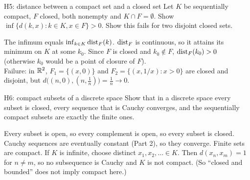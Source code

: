 \begin{exam}{H5: distance between a compact set and a closed set}
Let $K$ be sequentially compact, $F$ closed, both nonempty and $K\cap F=\emptyset$. Show
$\inf\{d(k,x):k\in K,x\in F\}>0$. Show this fails for two disjoint closed sets.
\end{exam}
\begin{answer}
The infimum equals $\inf_{k\in K}\operatorname{dist}_F(k)$. $\operatorname{dist}_F$ is continuous, so it attains its minimum
on $K$ at some $k_0$. Since $F$ is closed and $k_0\notin F$, $\operatorname{dist}_F(k_0)>0$ (otherwise $k_0$
would be a point of closure of $F$).\\
Failure: in $\mathbb R^2$, $F_1=\{(x,0)\}$ and $F_2=\{(x,1/x):x>0\}$ are closed and disjoint, but
$d\big((n,0),(n,\frac1n)\big)=\frac1n\to0$.
\end{answer}

\begin{exam}{H6: compact subsets of a discrete space}
Show that in a discrete space every subset is closed, every sequence that is Cauchy converges,
and the sequentially compact subsets are exactly the finite ones.
\end{exam}
\begin{answer}
Every subset is open, so every complement is open, so every subset is closed. Cauchy sequences
are eventually constant (Part 2), so they converge. Finite sets are compact. If $K$ is infinite,
choose distinct $x_1,x_2,\dots\in K$. Then $d(x_n,x_m)=1$ for $n\ne m$, so no subsequence is
Cauchy and $K$ is not compact. (So ``closed and bounded'' does not imply compact here.)
\end{answer}

